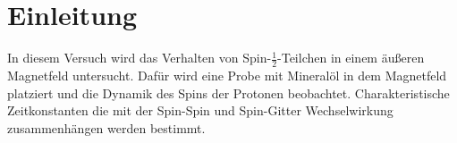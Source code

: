 \section{Einleitung}
In diesem Versuch wird das Verhalten von Spin-$\frac{1}{2}$-Teilchen in einem äußeren Magnetfeld untersucht. Dafür wird eine Probe mit Mineralöl in dem Magnetfeld platziert und die Dynamik des Spins der Protonen beobachtet. Charakteristische Zeitkonstanten die mit der Spin-Spin und Spin-Gitter Wechselwirkung zusammenhängen werden bestimmt.

